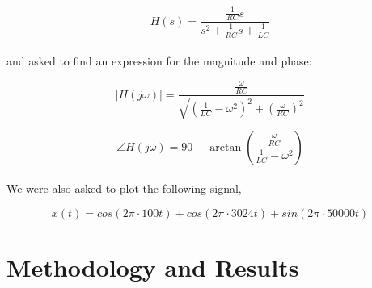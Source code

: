 \documentclass[12pt,a4paper]{article}
\begin{document}
$$H(s) = \frac{\frac{1}{RC}s}{s^2 + \frac{1}{RC}s + \frac{1}{LC}}$$\\

and asked to find an expression for the magnitude and phase:

    $$|H(j\omega)| = \frac{\frac{\omega}{RC}}{\sqrt{(\frac{1}{LC}-\omega^2)^2+(\frac{\omega}{RC})^2}}$$
    
    $$\angle H(j\omega) = 90 - \arctan(\frac{\frac{\omega}{RC}}{\frac{1}{LC}-\omega^2})$$\\

We were also asked to plot the following signal,

    $$x(t) = cos(2\pi \cdot 100t) + cos(2\pi \cdot 3024t) + sin(2\pi \cdot 50000t)$$

\clearpage
\section{Methodology and Results}\label{sec:meth}
\end{document}

